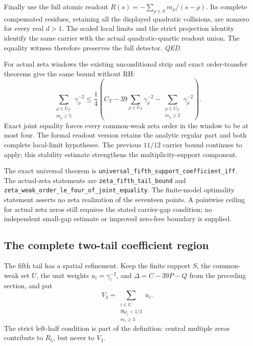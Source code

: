Finally use the full atomic readout
\(R(s)=-\sum_{\rho\in S}m_\rho/(s-\rho)\).
Its complete compensated residues, retaining all the displayed
quadratic collisions, are nonzero for every real \(d>1\).
The scaled local limits and the strict projection identity identify
the same carrier with the actual quadratic-quartic readout union.
The equality witness therefore preserves the full detector.
\hfill\textit{QED.}

For actual zeta windows the existing unconditional strip and exact
order-transfer theorems give the same bound without RH:
\[
 \sum_{\substack{\rho\in U_T\\m_\rho\ge5}}\gamma_\rho^{-2}
 \le\frac14\left(
       C_T-39\sum_{\rho\in U_T}\gamma_\rho^{-2}
          -\sum_{\substack{\rho\in U_T\\m_\rho\ge2}}\gamma_\rho^{-2}
           \right).
\]
Exact joint equality forces every common-weak zeta order in the window
to be at most four. The formal readout version retains the analytic
regular part and both complete local-limit hypotheses.
The previous \(11/12\) carrier bound continues to apply; this stability
estimate strengthens the multiplicity-support component.

The exact universal theorem is
\texttt{universal\_fifth\_support\_coefficient\_iff}.
The actual-zeta statements are
\texttt{zeta\_fifth\_tail\_bound} and
\texttt{zeta\_weak\_order\_le\_four\_of\_joint\_equality}.
The finite-model optimality statement asserts no zeta realization of
the seventeen points. A pointwise ceiling for actual zeta zeros still
requires the stated carrier-gap condition; no independent small-gap
estimate or improved zero-free boundary is supplied.

\subsection{The complete two-tail coefficient region}
\label{sec:two-tail-region}

The fifth tail has a spatial refinement. Keep the finite support \(S\),
the common-weak set \(U\), the unit weights \(u_i=\gamma_i^{-2}\), and
\(\Delta=C-39P-Q\) from the preceding section, and put
\[
 V_3=\sum_{\substack{i\in U\\ \Re\rho_i<1/2\\m_i\ge3}}u_i.
\]
The strict left-half condition is part of the definition: central
multiple zeros contribute to \(R_5\), but never to \(V_3\).

